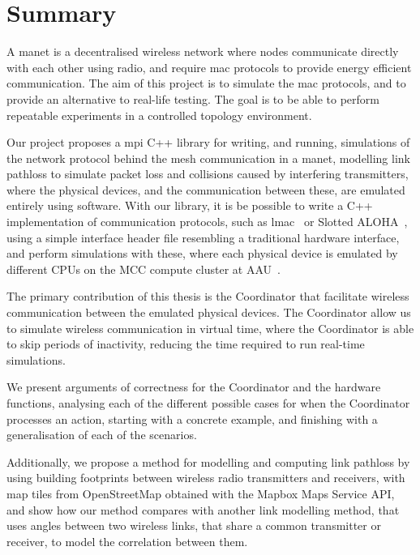 \chapter*{Summary}\label{ch:summary}

A \acrfull{manet} is a decentralised wireless network where nodes communicate directly with each other using
radio, and require \gls{mac} protocols to provide energy efficient communication. The aim of this project is
to simulate the \gls{mac} protocols, and to provide an alternative to real-life testing. The goal is to be
able to perform repeatable experiments in a controlled topology environment. \medbreak

Our project proposes a \gls{mpi} C++ library for writing, and running, simulations of the network protocol
behind the mesh communication in a \gls{manet}, modelling link \gls{pathloss} to simulate packet loss and
collisions caused by interfering transmitters, where the physical devices, and the communication between
these, are emulated entirely using software. With our library, it is be possible to write a C++ implementation
of communication protocols, such as \gls{lmac}~\cite{paper:lmac_protocol} or Slotted
ALOHA~\cite{Roberts:1975:APS:1024916.1024920}, using a simple interface header file resembling a traditional
hardware interface, and perform simulations with these, where each physical device is emulated by different
CPUs on the MCC compute cluster at AAU~\cite{website:mccaau}. \medbreak

The primary contribution of this thesis is the Coordinator that facilitate wireless communication between the
emulated physical devices. The Coordinator allow us to simulate wireless communication in virtual time, where
the Coordinator is able to skip periods of inactivity, reducing the time required to run real-time
simulations. \medbreak

We present arguments of correctness for the Coordinator and the hardware functions, analysing each of the
different possible cases for when the Coordinator processes an action, starting with a concrete example, and
finishing with a generalisation of each of the scenarios. \medbreak

Additionally, we propose a method for modelling and computing link \gls{pathloss} by using building footprints
between wireless radio transmitters and receivers, with map tiles from OpenStreetMap obtained with the Mapbox
Maps Service API, and show how our method compares with another link modelling method, that uses angles
between two wireless links, that share a common transmitter or receiver, to model the correlation between
them. \medbreak

